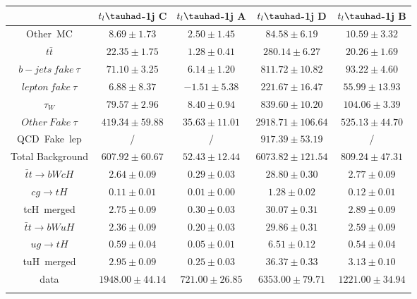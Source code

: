\centering
\begin{tabular}{ccccc} \toprule\toprule
 & $t_{l}\tauhad$-1j C & $t_{l}\tauhad$-1j A & $t_{l}\tauhad$-1j D & $t_{l}\tauhad$-1j B\\\midrule
Other~MC & $8.69\pm1.73$ & $2.50\pm1.45$ & $84.58\pm6.19$ & $10.59\pm3.32$\\
$t\bar{t}$ & $22.35\pm1.75$ & $1.28\pm0.41$ & $280.14\pm6.27$ & $20.26\pm1.69$\\
$b-jets~fake~\tau$ & $71.10\pm3.25$ & $6.14\pm1.20$ & $811.72\pm10.82$ & $93.22\pm4.60$\\
$lepton~fake~\tau$ & $6.88\pm8.37$ & $-1.51\pm5.38$ & $221.67\pm16.47$ & $55.99\pm13.93$\\
$\tau_{W}$ & $79.57\pm2.96$ & $8.40\pm0.94$ & $839.60\pm10.20$ & $104.06\pm3.39$\\
$Other~Fake~\tau$ & $419.34\pm59.88$ & $35.63\pm11.01$ & $2918.71\pm106.64$ & $525.13\pm44.70$\\
QCD~Fake~lep &  / &  / & $917.39\pm53.19$ &  /\\\midrule
Total Background & $607.92\pm60.67$ & $52.43\pm12.44$ & $6073.82\pm121.54$ & $809.24\pm47.31$\\\midrule\midrule
$\bar{t}t\to bWcH$ & $2.64\pm0.09$ & $0.29\pm0.03$ & $28.80\pm0.30$ & $2.77\pm0.09$\\
$cg\to tH$ & $0.11\pm0.01$ & $0.01\pm0.00$ & $1.28\pm0.02$ & $0.12\pm0.01$\\
tcH~merged & $2.75\pm0.09$ & $0.30\pm0.03$ & $30.07\pm0.31$ & $2.89\pm0.09$\\\midrule
$\bar{t}t\to bWuH$ & $2.36\pm0.09$ & $0.20\pm0.03$ & $29.86\pm0.31$ & $2.59\pm0.09$\\
$ug\to tH$ & $0.59\pm0.04$ & $0.05\pm0.01$ & $6.51\pm0.12$ & $0.54\pm0.04$\\
tuH~merged & $2.95\pm0.09$ & $0.25\pm0.03$ & $36.37\pm0.33$ & $3.13\pm0.10$\\\midrule\midrule
data & $1948.00\pm44.14$ & $721.00\pm26.85$ & $6353.00\pm79.71$ & $1221.00\pm34.94$\\
\bottomrule\bottomrule\\
\end{tabular}
